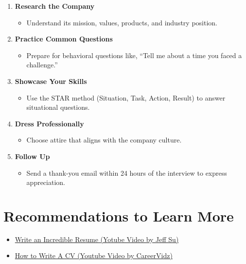 \documentclass[
  letterpaper,
  DIV=11,
  numbers=noendperiod]{scrreprt}
\providecommand{\tightlist}{%
  \setlength{\itemsep}{0pt}\setlength{\parskip}{0pt}}\usepackage{longtable,booktabs,array}
\begin{document}
\begin{enumerate}
\def\labelenumi{\arabic{enumi}.}
\item
  \textbf{Research the Company}

  \begin{itemize}
  \tightlist
  \item
    Understand its mission, values, products, and industry position.
  \end{itemize}
\item
  \textbf{Practice Common Questions}

  \begin{itemize}
  \tightlist
  \item
    Prepare for behavioral questions like, ``Tell me about a time you
    faced a challenge.''
  \end{itemize}
\item
  \textbf{Showcase Your Skills}

  \begin{itemize}
  \tightlist
  \item
    Use the STAR method (Situation, Task, Action, Result) to answer
    situational questions.
  \end{itemize}
\item
  \textbf{Dress Professionally}

  \begin{itemize}
  \tightlist
  \item
    Choose attire that aligns with the company culture.
  \end{itemize}
\item
  \textbf{Follow Up}

  \begin{itemize}
  \tightlist
  \item
    Send a thank-you email within 24 hours of the interview to express
    appreciation.
  \end{itemize}
\end{enumerate}

\section{Recommendations to Learn
More}\label{recommendations-to-learn-more-1}

\begin{itemize}
\tightlist
\item
  \href{https://www.youtube.com/watch?v=Tt08KmFfIYQ&pp=ygUKQ1Ygd3JpdGluZw\%3D\%3D}{Write
  an Incredible Resume (Yotube Video by Jeff Su)}
\item
  \href{https://www.youtube.com/watch?v=CaeUwaaeGpg&pp=ygUKQ1Ygd3JpdGluZw\%3D\%3D}{How
  to Write A CV (Youtube Video by CareerVidz)}
\end{itemize}
\end{document}
